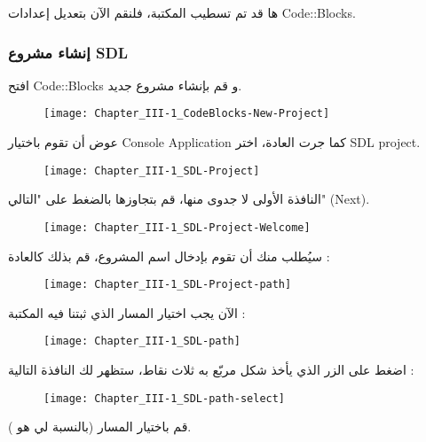 ها قد تم تسطيب المكتبة، فلنقم الآن بتعديل إعدادات
\textenglish{Code::Blocks}.

\subsubsection{إنشاء مشروع \textenglish{SDL}}

افتح
\textenglish{Code::Blocks}
و قم بإنشاء مشروع جديد.

\begin{figure}[H]
	\centering
	\texttt{[image: Chapter\_III-1\_CodeBlocks-New-Project]}
\end{figure}


عوض أن تقوم باختيار 
\textenglish{Console Application}
كما جرت العادة، اختر 
\textenglish{SDL project}.

\begin{figure}[H]
	\centering
	\texttt{[image: Chapter\_III-1\_SDL-Project]}
\end{figure}

النافذة الأولى لا جدوى منها، قم بتجاوزها بالضغط على "التالي"
(\textenglish{Next}).

\begin{figure}[H]
	\centering
	\texttt{[image: Chapter\_III-1\_SDL-Project-Welcome]}
\end{figure}

سيُطلب منك أن تقوم بإدخال اسم المشروع، قم بذلك كالعادة :

\begin{figure}[H]
	\centering
	\texttt{[image: Chapter\_III-1\_SDL-Project-path]}
\end{figure}

الآن يجب اختيار المسار الذي ثبتنا فيه المكتبة :

\begin{figure}[H]
	\centering
	\texttt{[image: Chapter\_III-1\_SDL-path]}
\end{figure}

اضغط على الزر الذي يأخذ شكل مربّع به ثلاث نقاط، ستظهر لك النافذة التالية :

\begin{figure}[H]
	\centering
	\texttt{[image: Chapter\_III-1\_SDL-path-select]}
\end{figure}

قم باختيار المسار (بالنسبة لي هو
).

